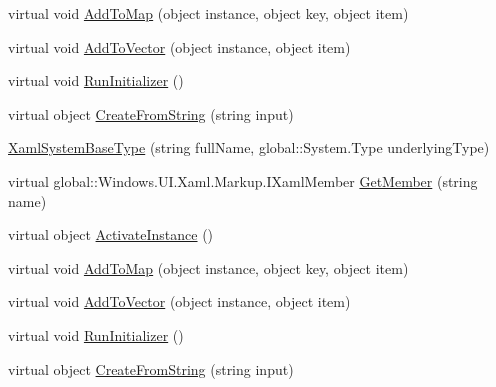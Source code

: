 \begin{DoxyCompactItemize}
\item 
virtual void \hyperlink{class_eli_log_in_app_1_1_eli_log_in_app___xaml_type_info_1_1_xaml_system_base_type_a4dffdc8ec19394a69290fe35b0c1af77}{Add\+To\+Map} (object instance, object key, object item)
\item 
virtual void \hyperlink{class_eli_log_in_app_1_1_eli_log_in_app___xaml_type_info_1_1_xaml_system_base_type_a8e642a4b95d9f9005400a4a679712152}{Add\+To\+Vector} (object instance, object item)
\item 
virtual void \hyperlink{class_eli_log_in_app_1_1_eli_log_in_app___xaml_type_info_1_1_xaml_system_base_type_a370a5c7e927ff1516755990b37949053}{Run\+Initializer} ()
\item 
virtual object \hyperlink{class_eli_log_in_app_1_1_eli_log_in_app___xaml_type_info_1_1_xaml_system_base_type_a8d9cb74aeb00c1919991b90adcc67373}{Create\+From\+String} (string input)
\item 
\hyperlink{class_eli_log_in_app_1_1_eli_log_in_app___xaml_type_info_1_1_xaml_system_base_type_a41decf5b936f07eec2dd5f81d55bac76}{Xaml\+System\+Base\+Type} (string full\+Name, global\+::\+System.\+Type underlying\+Type)
\item 
virtual global\+::\+Windows.\+U\+I.\+Xaml.\+Markup.\+I\+Xaml\+Member \hyperlink{class_eli_log_in_app_1_1_eli_log_in_app___xaml_type_info_1_1_xaml_system_base_type_a9fafc5073fe416f1c73685c65e01cce7}{Get\+Member} (string name)
\item 
virtual object \hyperlink{class_eli_log_in_app_1_1_eli_log_in_app___xaml_type_info_1_1_xaml_system_base_type_a77ebd9293eddf50b03c4973efd4dcd6f}{Activate\+Instance} ()
\item 
virtual void \hyperlink{class_eli_log_in_app_1_1_eli_log_in_app___xaml_type_info_1_1_xaml_system_base_type_a4dffdc8ec19394a69290fe35b0c1af77}{Add\+To\+Map} (object instance, object key, object item)
\item 
virtual void \hyperlink{class_eli_log_in_app_1_1_eli_log_in_app___xaml_type_info_1_1_xaml_system_base_type_a8e642a4b95d9f9005400a4a679712152}{Add\+To\+Vector} (object instance, object item)
\item 
virtual void \hyperlink{class_eli_log_in_app_1_1_eli_log_in_app___xaml_type_info_1_1_xaml_system_base_type_a370a5c7e927ff1516755990b37949053}{Run\+Initializer} ()
\item 
virtual object \hyperlink{class_eli_log_in_app_1_1_eli_log_in_app___xaml_type_info_1_1_xaml_system_base_type_a8d9cb74aeb00c1919991b90adcc67373}{Create\+From\+String} (string input)
\end{DoxyCompactItemize}
